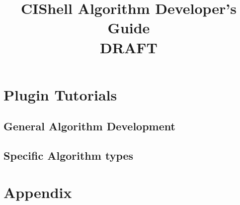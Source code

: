 \documentclass[pdftex,11pt,a4paper]{article}
\title{CIShell Algorithm Developer's Guide \\
\textbf{DRAFT}}
\begin{document}
\maketitle{}
\tableofcontents{}




\section{Plugin Tutorials}


\subsection{General Algorithm Development}





\subsection{Specific Algorithm types}












\section{Appendix}




\clearpage


\end{document}
